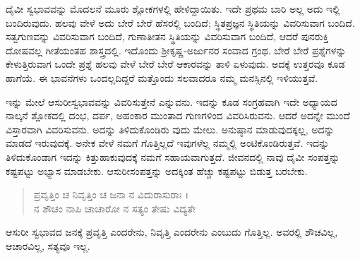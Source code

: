 ದೈವೀ ಸ್ವಭಾವವನ್ನು ಮೊದಲನೆ ಮೂರು ಶ್ಲೋಕಗಳಲ್ಲಿ ಹೇಳಿದ್ದಾಯಿತು. ಇದೇ ಪ್ರಥಮ ಬಾರಿ ಅಲ್ಲ ಅದು ಇಲ್ಲಿ ಬಂದಿರುವುದು. ಹಲವು ವೇಳೆ ಅದು ಬೇರೆ ಬೇರೆ ಹೆಸರಲ್ಲಿ ಬಂದಿದೆ; ಸ್ಥಿತಪ್ರಜ್ಞನ ಸ್ಥಿತಿಯನ್ನು ವಿವರಿಸುವಾಗ ಬಂದಿದೆ. ಸತ್ವಗುಣವನ್ನು ವಿವರಿಸುವಾಗ ಬಂದಿದೆ, ಗುಣಾತೀತನ ಸ್ಥಿತಿಯನ್ನು ವಿವರಿಸುವಾಗ ಬಂದಿದೆ, ಆದರೆ ಪುನರುಕ್ತಿ ದೋಷವಲ್ಲ ಗೀತೆಯಂತಹ ಶಾಸ್ತ್ರದಲ್ಲಿ. ಇದೊಂದು ಶ್ರೀಕೃಷ್ಣ-ಅರ್ಜುನರ ಸಂವಾದ ಗ್ರಂಥ. ಬೇರೆ ಬೇರೆ ಪ್ರಶ್ನೆಗಳನ್ನು ಕೇಳುತ್ತಿರುವಾಗ ಒಂದೇ ಪ್ರಶ್ನೆ ಹಲವು ವೇಳೆ ಬೇರೆ ಬೇರೆ ಆಕಾರವನ್ನು ತಾಳಿ ಏಳುವುದು. ಅದಕ್ಕೆ ಉತ್ತರವೂ ಕೂಡ ಹಾಗೆಯೆ. ಈ ಭಾವನೆಗಳು ಒಂದಲ್ಲದಿದ್ದರೆ ಮತ್ತೊಂದು ಸಲವಾದರೂ ನಮ್ಮ ಮನಸ್ಸಿನಲ್ಲಿ ಇಳಿಯುತ್ತವೆ.

ಇನ್ನು ಮೇಲೆ ಆಸುರೀಸ್ವಭಾವವನ್ನು ವಿವರಿಸುತ್ತೇನೆ ಎನ್ನುವನು. ಇದನ್ನು ಕೂಡ ಸಂಗ್ರಹವಾಗಿ ಇದೇ ಅಧ್ಯಾಯದ ನಾಲ್ಕನೆ ಶ್ಲೋಕದಲ್ಲಿ ದಂಭ, ದರ್ಪ, ಅಹಂಕಾರ ಮುಂತಾದ ಗುಣಗಳಿಂದ ವಿವರಿಸಿರುವನು. ಆದರೆ ಅದನ್ನೇ ಮುಂದೆ ವಿಸ್ತಾರವಾಗಿ ವಿವರಿಸುವನು. ಅದನ್ನು ತಿಳಿದುಕೊಂಡಿರು ವುದು ಮೇಲು. ಅನುಷ್ಠಾನ ಮಾಡುವುದಕ್ಕಲ್ಲ, ಅದನ್ನು ಮಾಡದೆ ಇರುವುದಕ್ಕೆ. ಅನೇಕ ವೇಳೆ ನಮಗೆ ಗೊತ್ತಿಲ್ಲದೆ ಇವುಗಳೆಲ್ಲ ನಮ್ಮಲ್ಲಿ ಅಂಟಿಕೊಂಡಿರುತ್ತವೆ. ಇದನ್ನು ತಿಳಿದುಕೊಂಡಾಗ ಇದನ್ನು ಕಿತ್ತುಹಾಕುವುದಕ್ಕೆ ನಮಗೆ ಸಹಾಯವಾಗುತ್ತದೆ. ಜೀವನದಲ್ಲಿ ನಾವು ದೈವೀ ಸಂಪತ್ತನ್ನು ಕಷ್ಟಪಟ್ಟು ಅಭ್ಯಾಸ ಮಾಡಬೇಕು. ಆಸುರೀಸಂಪತ್ತನ್ನು ಅದಕ್ಕಿಂತ ಹೆಚ್ಚು ಕಷ್ಟಪಟ್ಟು ಬಿಡುತ್ತ ಬರಬೇಕು.

\begin{verse}
ಪ್ರವೃತ್ತಿಂ ಚ ನಿವೃತ್ತಿಂ ಚ ಜನಾ ನ ವಿದುರಾಸುರಾಃ ।\\ನ ಶೌಚಂ ನಾಪಿ ಚಾಚಾರೋ ನ ಸತ್ಯಂ ತೇಷು ವಿದ್ಯತೇ 
\end{verse}

{\small ಆಸುರೀ ಸ್ವಭಾವದ ಜನಕ್ಕೆ ಪ್ರವೃತ್ತಿ ಎಂದರೇನು, ನಿವೃತ್ತಿ ಎಂದರೇನು ಎಂಬುದು ಗೊತ್ತಿಲ್ಲ. ಅವರಲ್ಲಿ ಶೌಚವಿಲ್ಲ, ಆಚಾರವಿಲ್ಲ, ಸತ್ಯವೂ ಇಲ್ಲ.}

